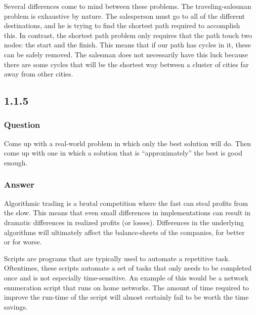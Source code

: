 \documentclass{article}
\begin{document}
                Several differences come to mind between these problems. The traveling-salesman problem is exhaustive by nature.
                The salesperson must go to all of the different destinations, and he is trying to find the shortest path required
                to accomplish this. In contrast, the shortest path problem only requires that the path touch two nodes: the start
                and the finish. This means that if our path has cycles in it, these can be safely removed. The salesman does not
                necessarily have this luck because there are some cycles that will be the shortest way between a cluster of cities
                far away from other cities.
        \subsection{1.1.5}
            \subsubsection{Question}
                Come up with a real-world problem in which only the best solution will do. Then
                come up with one in which a solution that is “approximately” the best is good
                enough.

            \subsubsection{Answer}
                Algorithmic trading is a brutal competition where the fast can steal profits from the slow. This means that even
                small differences in implementations can result in dramatic differences in realized profits (or losses). Differences 
                in the underlying algorithms will ultimately affect the balance-sheets of the companies, for better or for worse.

                Scripts are programs that are typically used to automate a repetitive task. Oftentimes, these scripts automate a set
                of tasks that only needs to be completed once and is not especially time-sensitive. An example of this would be a
                network enumeration script that runs on home networks. The amount of time required to improve the run-time of the script
                will almost certainly fail to be worth the time savings.
\end{document}
